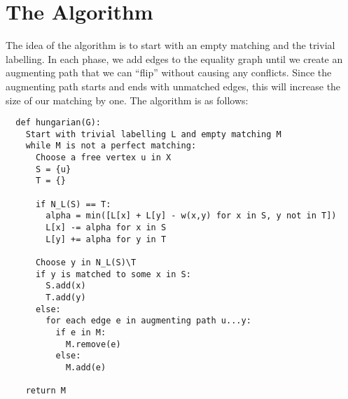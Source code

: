 \documentclass[12pt]{article}
\begin{document}
\section*{The Algorithm}
The idea of the algorithm is to start with an empty matching and the trivial labelling. In each phase, we add edges to the equality graph until we create an augmenting path that we can ``flip'' without causing any conflicts. Since the augmenting path starts and ends with unmatched edges, this will increase the size of our matching by one. The algorithm is as follows:

\begin{verbatim}
  def hungarian(G):
    Start with trivial labelling L and empty matching M
    while M is not a perfect matching:
      Choose a free vertex u in X
      S = {u}
      T = {}

      if N_L(S) == T:
        alpha = min([L[x] + L[y] - w(x,y) for x in S, y not in T])
        L[x] -= alpha for x in S
        L[y] += alpha for y in T

      Choose y in N_L(S)\T
      if y is matched to some x in S:
        S.add(x)
        T.add(y)
      else:
        for each edge e in augmenting path u...y:
          if e in M:
            M.remove(e)
          else:
            M.add(e)

    return M
\end{verbatim}
\end{document}

